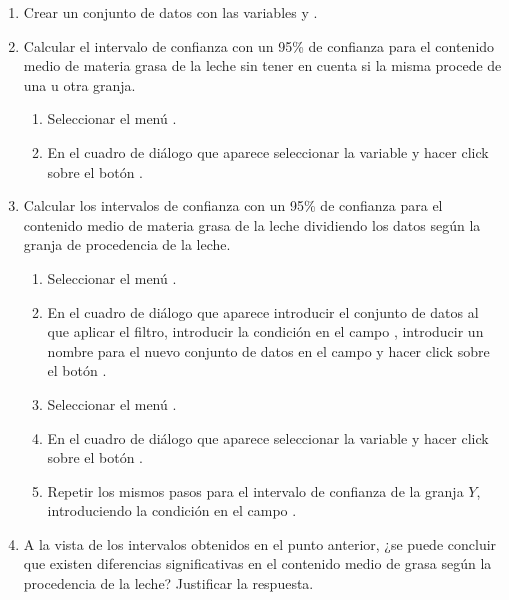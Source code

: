 \begin{enumerate}[leftmargin=*]
\begin{enumerate}
\item Crear un conjunto de datos con las variables  y .
\item Calcular el intervalo de confianza con un 95\% de confianza para el contenido medio de materia grasa de la leche
sin tener en cuenta si la misma procede de una u otra granja.
\begin{indicacion}{
\begin{enumerate}
\item Seleccionar el menú .
\item En el cuadro de diálogo que aparece seleccionar la variable  y hacer click sobre el botón .
\end{enumerate}
}
\end{indicacion}

\item Calcular los intervalos de confianza con un 95\% de confianza para el contenido medio de materia grasa de la leche
dividiendo los datos según la granja de procedencia de la leche. 
\begin{indicacion}{
\begin{enumerate}
\item Seleccionar el menú .
\item En el cuadro de diálogo que aparece introducir el conjunto de datos al que aplicar el filtro, introducir la condición  en el campo ,
introducir un nombre para el nuevo conjunto de datos en el campo  y hacer click sobre el botón
.
\item Seleccionar el menú .
\item En el cuadro de diálogo que aparece seleccionar la variable  y hacer click sobre el botón .
\item Repetir los mismos pasos para el intervalo de confianza de la granja $Y$, introduciendo la condición  en el
campo .
\end{enumerate}
}
\end{indicacion}

\item A la vista de los intervalos obtenidos en el punto anterior, ¿se puede concluir que existen diferencias
significativas en el contenido medio de grasa según la procedencia de la leche? Justificar la respuesta.
\end{enumerate}



\end{enumerate}
